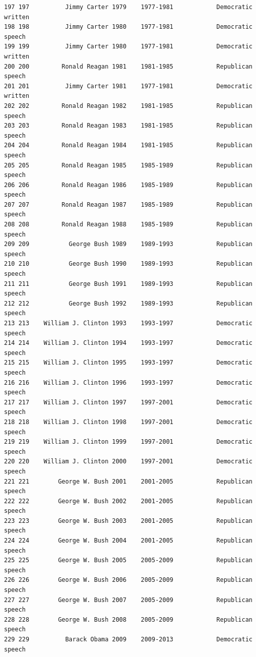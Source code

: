 \documentclass[
  letterpaper,
  DIV=11,
  numbers=noendperiod]{scrreprt}
\begin{document}
\begin{verbatim}
197 197          Jimmy Carter 1979    1977-1981            Democratic   written
198 198          Jimmy Carter 1980    1977-1981            Democratic    speech
199 199          Jimmy Carter 1980    1977-1981            Democratic   written
200 200         Ronald Reagan 1981    1981-1985            Republican    speech
201 201          Jimmy Carter 1981    1977-1981            Democratic   written
202 202         Ronald Reagan 1982    1981-1985            Republican    speech
203 203         Ronald Reagan 1983    1981-1985            Republican    speech
204 204         Ronald Reagan 1984    1981-1985            Republican    speech
205 205         Ronald Reagan 1985    1985-1989            Republican    speech
206 206         Ronald Reagan 1986    1985-1989            Republican    speech
207 207         Ronald Reagan 1987    1985-1989            Republican    speech
208 208         Ronald Reagan 1988    1985-1989            Republican    speech
209 209           George Bush 1989    1989-1993            Republican    speech
210 210           George Bush 1990    1989-1993            Republican    speech
211 211           George Bush 1991    1989-1993            Republican    speech
212 212           George Bush 1992    1989-1993            Republican    speech
213 213    William J. Clinton 1993    1993-1997            Democratic    speech
214 214    William J. Clinton 1994    1993-1997            Democratic    speech
215 215    William J. Clinton 1995    1993-1997            Democratic    speech
216 216    William J. Clinton 1996    1993-1997            Democratic    speech
217 217    William J. Clinton 1997    1997-2001            Democratic    speech
218 218    William J. Clinton 1998    1997-2001            Democratic    speech
219 219    William J. Clinton 1999    1997-2001            Democratic    speech
220 220    William J. Clinton 2000    1997-2001            Democratic    speech
221 221        George W. Bush 2001    2001-2005            Republican    speech
222 222        George W. Bush 2002    2001-2005            Republican    speech
223 223        George W. Bush 2003    2001-2005            Republican    speech
224 224        George W. Bush 2004    2001-2005            Republican    speech
225 225        George W. Bush 2005    2005-2009            Republican    speech
226 226        George W. Bush 2006    2005-2009            Republican    speech
227 227        George W. Bush 2007    2005-2009            Republican    speech
228 228        George W. Bush 2008    2005-2009            Republican    speech
229 229          Barack Obama 2009    2009-2013            Democratic    speech

\end{verbatim}
\end{document}
